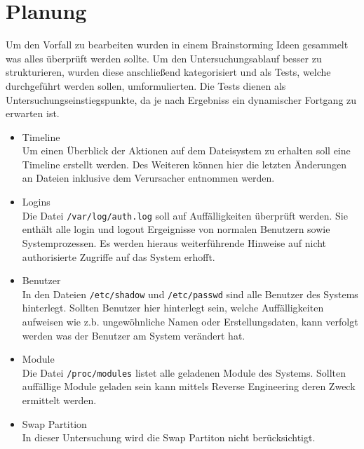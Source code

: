 \section{Planung}
Um den Vorfall zu bearbeiten wurden in einem Brainstorming Ideen gesammelt was alles überprüft werden sollte. Um den Untersuchungsablauf besser zu strukturieren, wurden diese anschließend kategorisiert und als Tests, welche durchgeführt werden sollen, umformulierten. Die Tests dienen als Untersuchungseinstiegspunkte, da je nach Ergebniss ein dynamischer Fortgang zu erwarten ist.

\begin{itemize}
\item Timeline\\
Um einen Überblick der Aktionen auf dem Dateisystem zu erhalten soll eine Timeline erstellt werden.
Des Weiteren können hier die letzten Änderungen an Dateien inklusive dem Verursacher entnommen werden.

\item Logins\\
Die Datei \texttt{/var/log/auth.log} soll auf Auffälligkeiten überprüft werden. Sie enthält alle login und logout Ergeignisse von normalen Benutzern sowie Systemprozessen. 
Es werden hieraus weiterführende Hinweise auf nicht authorisierte Zugriffe auf das System erhofft.

\item Benutzer\\
In den Dateien \texttt{/etc/shadow} und \texttt{/etc/passwd} sind alle Benutzer des Systems hinterlegt. Sollten Benutzer hier hinterlegt sein, welche Auffälligkeiten aufweisen wie z.b. ungewöhnliche Namen oder Erstellungsdaten, kann verfolgt werden was der Benutzer am System verändert hat.

\item Module\\
Die Datei \texttt{/proc/modules} listet alle geladenen Module des Systems. Sollten auffällige Module geladen sein kann mittels Reverse Engineering deren Zweck ermittelt werden.

\item Swap Partition\\
In dieser Untersuchung wird die Swap Partiton nicht berücksichtigt.
\end{itemize}